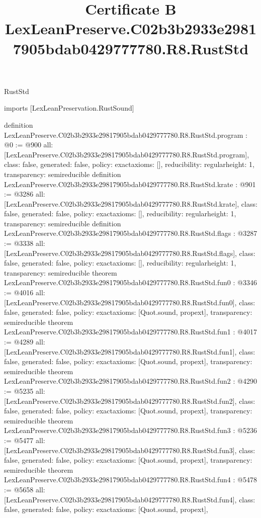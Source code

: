 \begin{lexlean}{RustStd}
\title{Certificate B LexLeanPreserve.C02b3b2933e29817905bdab0429777780.R8.RustStd}
\begin{coremodule}
imports [LexLeanPreservation.RustSound]

definition LexLeanPreserve.C02b3b2933e29817905bdab0429777780.R8.RustStd.program : @0 := @900 {
  all: [LexLeanPreserve.C02b3b2933e29817905bdab0429777780.R8.RustStd.program],
  class: false,
  generated: false,
  policy: exact{axioms: []},
  reducibility: regular{height: 1},
  transparency: semireducible
}
definition LexLeanPreserve.C02b3b2933e29817905bdab0429777780.R8.RustStd.krate : @901 := @3286 {
  all: [LexLeanPreserve.C02b3b2933e29817905bdab0429777780.R8.RustStd.krate],
  class: false,
  generated: false,
  policy: exact{axioms: []},
  reducibility: regular{height: 1},
  transparency: semireducible
}
definition LexLeanPreserve.C02b3b2933e29817905bdab0429777780.R8.RustStd.flags : @3287 := @3338 {
  all: [LexLeanPreserve.C02b3b2933e29817905bdab0429777780.R8.RustStd.flags],
  class: false,
  generated: false,
  policy: exact{axioms: []},
  reducibility: regular{height: 1},
  transparency: semireducible
}
theorem LexLeanPreserve.C02b3b2933e29817905bdab0429777780.R8.RustStd.fun0 : @3346 := @4016 {
  all: [LexLeanPreserve.C02b3b2933e29817905bdab0429777780.R8.RustStd.fun0],
  class: false,
  generated: false,
  policy: exact{axioms: [Quot.sound, propext]},
  transparency: semireducible
}
theorem LexLeanPreserve.C02b3b2933e29817905bdab0429777780.R8.RustStd.fun1 : @4017 := @4289 {
  all: [LexLeanPreserve.C02b3b2933e29817905bdab0429777780.R8.RustStd.fun1],
  class: false,
  generated: false,
  policy: exact{axioms: [Quot.sound, propext]},
  transparency: semireducible
}
theorem LexLeanPreserve.C02b3b2933e29817905bdab0429777780.R8.RustStd.fun2 : @4290 := @5235 {
  all: [LexLeanPreserve.C02b3b2933e29817905bdab0429777780.R8.RustStd.fun2],
  class: false,
  generated: false,
  policy: exact{axioms: [Quot.sound, propext]},
  transparency: semireducible
}
theorem LexLeanPreserve.C02b3b2933e29817905bdab0429777780.R8.RustStd.fun3 : @5236 := @5477 {
  all: [LexLeanPreserve.C02b3b2933e29817905bdab0429777780.R8.RustStd.fun3],
  class: false,
  generated: false,
  policy: exact{axioms: [Quot.sound, propext]},
  transparency: semireducible
}
theorem LexLeanPreserve.C02b3b2933e29817905bdab0429777780.R8.RustStd.fun4 : @5478 := @5658 {
  all: [LexLeanPreserve.C02b3b2933e29817905bdab0429777780.R8.RustStd.fun4],
  class: false,
  generated: false,
  policy: exact{axioms: [Quot.sound, propext]},
}
\end{coremodule}
\end{lexlean}
